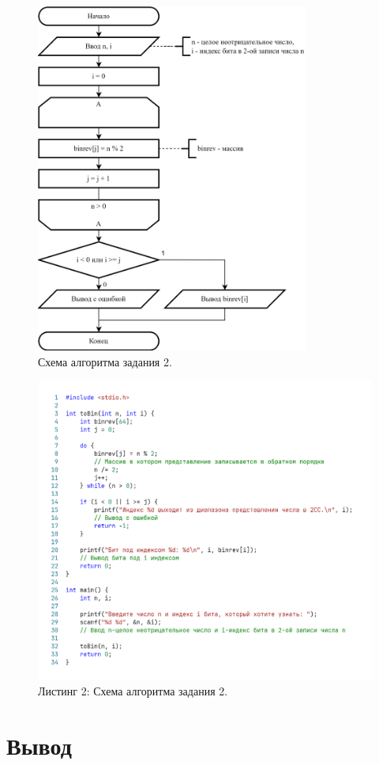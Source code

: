\documentclass[oneside,a4paper,14pt]{extarticle} %
\begin{document}
\newpage
\begin{figure}[h!]
	\centering
	\includegraphics[width=0.8\textwidth]{pics/2-flowchart.png}
	\caption{Схема алгоритма задания 2.}
\end{figure}
\newpage
\begin{figure}[h!]
	\centering
	\includegraphics[width=1\textwidth]{pics/2-listing.png}
	\caption*{Листинг 2: Схема алгоритма задания 2.}
\end{figure}
\newpage
\section*{Вывод}
\end{document}
